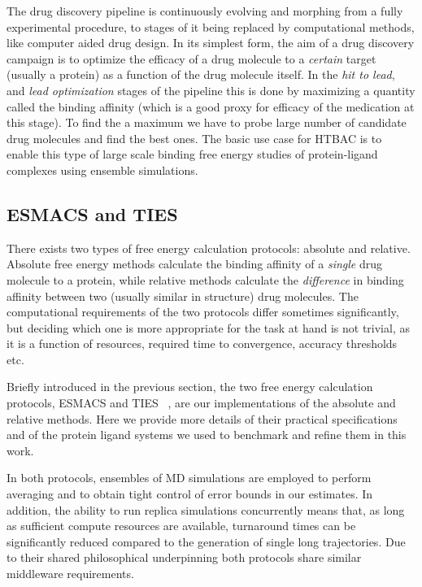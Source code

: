 
The drug discovery pipeline is continuously evolving and morphing from a fully experimental procedure, to stages of it being replaced by computational methods, like computer aided drug design. In its simplest form, the aim of a drug discovery campaign is to optimize the efficacy of a drug molecule to a \emph{certain} target (usually a protein) as a function of the drug molecule itself. In the \emph{hit to lead}, and \emph{lead optimization} stages of the pipeline this is done by maximizing a quantity called the binding affinity (which is a good proxy for efficacy of the medication at this stage). To find the a maximum we have to probe large number of candidate drug molecules and find the best ones. The basic use case for HTBAC is to enable this type of large scale binding free energy studies of protein-ligand complexes using ensemble simulations. 

\subsection{ESMACS and TIES}


There exists two types of free energy calculation protocols: absolute and 
relative. Absolute free energy methods calculate the binding affinity of a 
\emph{single} drug molecule to a protein, while relative methods calculate the 
\emph{difference} in binding affinity between two (usually similar in 
structure) drug molecules. The computational requirements of the two protocols 
differ sometimes significantly, but deciding which one is more appropriate for 
the task at hand is not trivial, as it is a function of resources, required 
time to convergence, accuracy thresholds etc.

Briefly introduced in the previous section, the two free energy calculation 
protocols, ESMACS and TIES ~\cite{Wan2017brd4, Bhati2017}, are our 
implementations of the absolute and relative methods. Here we provide more 
details of their practical specifications and of the protein ligand systems we 
used to benchmark and refine them in this work.


In both protocols, ensembles of MD simulations are employed to perform 
averaging and to obtain tight control of error bounds in our estimates. In 
addition, the ability to run replica simulations concurrently means that, as 
long as sufficient compute resources are available, turnaround times can be  
significantly reduced compared to the generation of single long trajectories. 
Due to their shared philosophical underpinning both protocols share similar 
middleware requirements.


